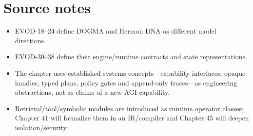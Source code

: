 \chapter*{Source notes}
\begin{itemize}
\item EVOD-18--24 define DOGMA and Hermon DNA as different model directions.
\item EVOD-30--38 define their engine/runtime contracts and state representations.
\item The chapter uses established systems concepts---capability interfaces, opaque handles, typed plans, policy gates and append-only traces---as engineering abstractions, not as claims of a new AGI capability.
\item Retrieval/tool/symbolic modules are introduced as runtime operator classes; Chapter 41 will formalize them in an IR/compiler and Chapter 45 will deepen isolation/security.
\end{itemize}
